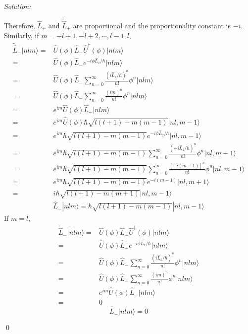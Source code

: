 \documentclass[10pt,a4paper]{article}
\newenvironment{sol}
    {\emph{Solution:}
    }
    {
    \qed
    }
\begin{document}
\begin{sol}
\begin{itemize}
Therefore, $\hat{L}_+$ and $\tilde{\hat{L}}_+$ are proportional and the proportionality constant is $-i$.\\
Similarly, if $m=-l+1,-l+2,\cdots,l-1,l$,
\begin{align}
\nonumber\tilde{\hat{L}}_-|nlm\rangle=&\hat{U}(\phi)\hat{L}_-\hat{U}^{\dagger}(\phi)|nlm\rangle\\
\nonumber=&\hat{U}(\phi)\hat{L}_-e^{-i\phi\hat{L}_z/\hbar}|nlm\rangle\\
\nonumber=&\hat{U}(\phi)\hat{L}_-\sum_{n=0}^{\infty}\frac{(i\hat{L}_z/\hbar)^n}{n!}\phi^n|nlm\rangle\\
\nonumber=&\hat{U}(\phi)\hat{L}_-\sum_{n=0}^{\infty}\frac{(im)^n}{n!}\phi^n|nlm\rangle\\
\nonumber=&e^{im}\hat{U}(\phi)\hat{L}_-|nlm\rangle\\
\nonumber=&e^{im}\hat{U}(\phi)\hbar\sqrt{l(l+1)-m(m-1)}|nl,m-1\rangle\\
\nonumber=&e^{im}\hbar\sqrt{l(l+1)-m(m-1)}e^{-i\phi\hat{L}_z/\hbar}|nl,m-1\rangle\\
\nonumber=&e^{im}\hbar\sqrt{l(l+1)-m(m-1)}\sum_{n=0}^{\infty}\frac{(-i\hat{L}_z/\hbar)^n}{n!}\phi^n|nl,m-1\rangle\\
\nonumber=&e^{im}\hbar\sqrt{l(l+1)-m(m-1)}\sum_{n=0}^{\infty}\frac{[-i(m-1)]^n}{n!}\phi^n|nl,m-1\rangle\\
\nonumber=&e^{im}\hbar\sqrt{l(l+1)-m(m-1)}e^{-i(m-1)}|nl,m+1\rangle\\
=&i\hbar\sqrt{l(l+1)-m(m+1)}|nl,m-1\rangle
\end{align}
\begin{align}
\hat{L}_-|nlm\rangle=\hbar\sqrt{l(l+1)-m(m-1)}|nl,m-1\rangle
\end{align}
If $m=l$,
\begin{align}
\nonumber\tilde{\hat{L}}_-|nlm\rangle=&\hat{U}(\phi)\hat{L}_-\hat{U}^{\dagger}(\phi)|nlm\rangle\\
\nonumber=&\hat{U}(\phi)\hat{L}_-e^{-i\phi\hat{L}_z/\hbar}|nlm\rangle\\
\nonumber=&\hat{U}(\phi)\hat{L}_-\sum_{n=0}^{\infty}\frac{(i\hat{L}_z/\hbar)^n}{n!}\phi^n|nlm\rangle\\
\nonumber=&\hat{U}(\phi)\hat{L}_-\sum_{n=0}^{\infty}\frac{(im)^n}{n!}\phi^n|nlm\rangle\\
\nonumber=&e^{im}\hat{U}(\phi)\hat{L}_-|nlm\rangle\\
=&0
\end{align}
\begin{equation}
\hat{L}_-|nlm\rangle=0
\end{equation}

\end{itemize}
\end{sol}
\end{document}
